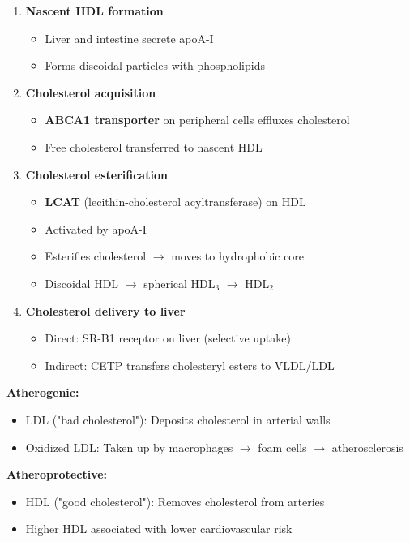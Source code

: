 \begin{enumerate}
    \item \textbf{Nascent HDL formation}
    \begin{itemize}
        \item Liver and intestine secrete apoA-I
        \item Forms discoidal particles with phospholipids
    \end{itemize}
    
    \item \textbf{Cholesterol acquisition}
    \begin{itemize}
        \item \textbf{ABCA1 transporter} on peripheral cells effluxes cholesterol
        \item Free cholesterol transferred to nascent HDL
    \end{itemize}
    
    \item \textbf{Cholesterol esterification}
    \begin{itemize}
        \item \textbf{LCAT} (lecithin-cholesterol acyltransferase) on HDL
        \item Activated by apoA-I
        \item Esterifies cholesterol $\rightarrow$ moves to hydrophobic core
        \item Discoidal HDL $\rightarrow$ spherical HDL$_3$ $\rightarrow$ HDL$_2$
    \end{itemize}
    
    \item \textbf{Cholesterol delivery to liver}
    \begin{itemize}
        \item Direct: SR-B1 receptor on liver (selective uptake)
        \item Indirect: CETP transfers cholesteryl esters to VLDL/LDL
    \end{itemize}
\end{enumerate}

\begin{tcolorbox}[colback=blue!5, colframe=blue!70!black, title=\textbf{Clinical Significance of Lipoproteins}]
\textbf{Atherogenic:}
\begin{itemize}
    \item LDL ("bad cholesterol"): Deposits cholesterol in arterial walls
    \item Oxidized LDL: Taken up by macrophages $\rightarrow$ foam cells $\rightarrow$ atherosclerosis
\end{itemize}

\textbf{Atheroprotective:}
\begin{itemize}
    \item HDL ("good cholesterol"): Removes cholesterol from arteries
    \item Higher HDL associated with lower cardiovascular risk
\end{itemize}
\end{tcolorbox}

